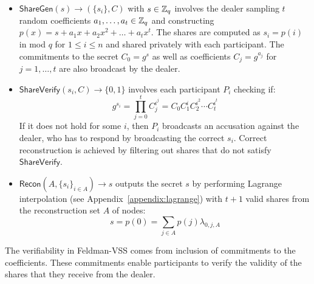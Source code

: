 \begin{itemize}
\item $\mathsf{ShareGen}(s) \rightarrow (\{s_i\}, C)$ with $s \in \mathbb{Z}_q$ involves the dealer sampling $t$ random coefficients $a_1, \ldots, a_t \in \mathbb{Z}_q$ and constructing $p(x) = s + a_1x+ a_2x^2 +\ldots+a_tx^t$. The shares are computed as $s_i = p(i)$ in mod $q$ for $1\le i \le n$ and shared privately with each participant. The commitments to the secret $C_0 = g^s$ as well as coefficients $C_j = g^{a_j}$ for $j = 1,\ldots,t$ are also broadcast by the dealer.
\item $\mathsf{ShareVerify}(s_i, C) \rightarrow \{0, 1\}$ involves each participant $P_i$ checking if:
$$g^{s_i} = \prod_{j = 0}^{t} C_j^{i^j} = C_0 C_1^i C_2^{i^2} \cdots C_{t}^{i^{t}}$$
If it does not hold for some $i$, then $P_i$ broadcasts an accusation against the dealer, who has to respond by broadcasting the correct $s_i$. Correct reconstruction is achieved by filtering out shares that do not satisfy $\mathsf{ShareVerify}$.
\item $\mathsf{Recon}(A, \{s_i\}_{i \in A}) \rightarrow s$ outputs the secret $s$ by performing Lagrange interpolation (see Appendix~\ref{appendix:lagrange}) with $t + 1$ valid shares from the reconstruction set $A$ of nodes:
$$s = p(0) = \sum_{j \in A} p(j) \lambda_{0, j, A}$$
\end{itemize}

The verifiability in Feldman-VSS comes from inclusion of commitments to the coefficients. These commitments enable participants to verify the validity of the shares that they receive from the dealer.



